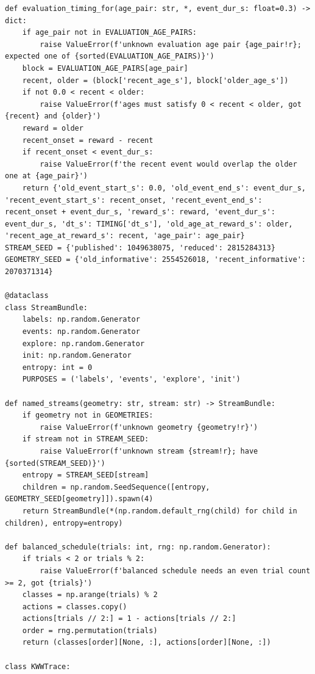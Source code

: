 \documentclass[a4paper,10pt]{article}
\begin{document}
\begin{Verbatim}
def evaluation_timing_for(age_pair: str, *, event_dur_s: float=0.3) -> dict:
    if age_pair not in EVALUATION_AGE_PAIRS:
        raise ValueError(f'unknown evaluation age pair {age_pair!r}; expected one of {sorted(EVALUATION_AGE_PAIRS)}')
    block = EVALUATION_AGE_PAIRS[age_pair]
    recent, older = (block['recent_age_s'], block['older_age_s'])
    if not 0.0 < recent < older:
        raise ValueError(f'ages must satisfy 0 < recent < older, got {recent} and {older}')
    reward = older
    recent_onset = reward - recent
    if recent_onset < event_dur_s:
        raise ValueError(f'the recent event would overlap the older one at {age_pair}')
    return {'old_event_start_s': 0.0, 'old_event_end_s': event_dur_s, 'recent_event_start_s': recent_onset, 'recent_event_end_s': recent_onset + event_dur_s, 'reward_s': reward, 'event_dur_s': event_dur_s, 'dt_s': TIMING['dt_s'], 'old_age_at_reward_s': older, 'recent_age_at_reward_s': recent, 'age_pair': age_pair}
STREAM_SEED = {'published': 1049638075, 'reduced': 2815284313}
GEOMETRY_SEED = {'old_informative': 2554526018, 'recent_informative': 2070371314}

@dataclass
class StreamBundle:
    labels: np.random.Generator
    events: np.random.Generator
    explore: np.random.Generator
    init: np.random.Generator
    entropy: int = 0
    PURPOSES = ('labels', 'events', 'explore', 'init')

def named_streams(geometry: str, stream: str) -> StreamBundle:
    if geometry not in GEOMETRIES:
        raise ValueError(f'unknown geometry {geometry!r}')
    if stream not in STREAM_SEED:
        raise ValueError(f'unknown stream {stream!r}; have {sorted(STREAM_SEED)}')
    entropy = STREAM_SEED[stream]
    children = np.random.SeedSequence([entropy, GEOMETRY_SEED[geometry]]).spawn(4)
    return StreamBundle(*(np.random.default_rng(child) for child in children), entropy=entropy)

def balanced_schedule(trials: int, rng: np.random.Generator):
    if trials < 2 or trials % 2:
        raise ValueError(f'balanced schedule needs an even trial count >= 2, got {trials}')
    classes = np.arange(trials) % 2
    actions = classes.copy()
    actions[trials // 2:] = 1 - actions[trials // 2:]
    order = rng.permutation(trials)
    return (classes[order][None, :], actions[order][None, :])

class KWWTrace:


\end{Verbatim}
\end{document}
